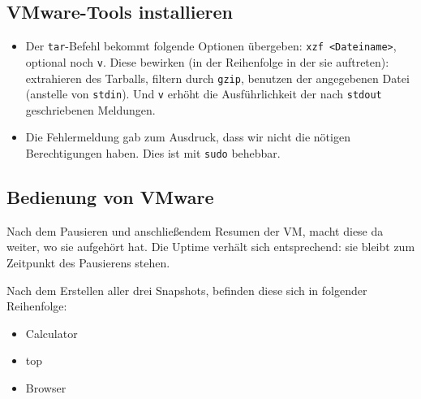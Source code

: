 \documentclass[12pt,a4paper]{article}
\begin{document}
\subsection{VMware-Tools installieren}
\begin{itemize}
    \item Der \texttt{tar}-Befehl bekommt folgende Optionen übergeben:
        \texttt{xzf <Dateiname>}, optional noch \texttt{v}. Diese bewirken
        (in der Reihenfolge in der sie auftreten): extrahieren des Tarballs,
        filtern durch \texttt{gzip}, benutzen der angegebenen Datei
        (anstelle von \texttt{stdin}). Und \texttt{v} erhöht die Ausführlichkeit
        der nach \texttt{stdout} geschriebenen Meldungen.
    \item Die Fehlermeldung gab zum Ausdruck, dass wir nicht die nötigen Berechtigungen
        haben. Dies ist mit \texttt{sudo} behebbar.
\end{itemize}
\subsection{Bedienung von VMware}
    Nach dem Pausieren und anschließendem Resumen der VM, macht diese da weiter,
    wo sie aufgehört hat. Die Uptime verhält sich entsprechend: sie bleibt zum
    Zeitpunkt des Pausierens stehen.

    Nach dem Erstellen aller drei Snapshots, befinden diese sich in folgender Reihenfolge:
    \begin{itemize}
        \item Calculator
        \item top
        \item Browser
    \end{itemize}
\end{document}
